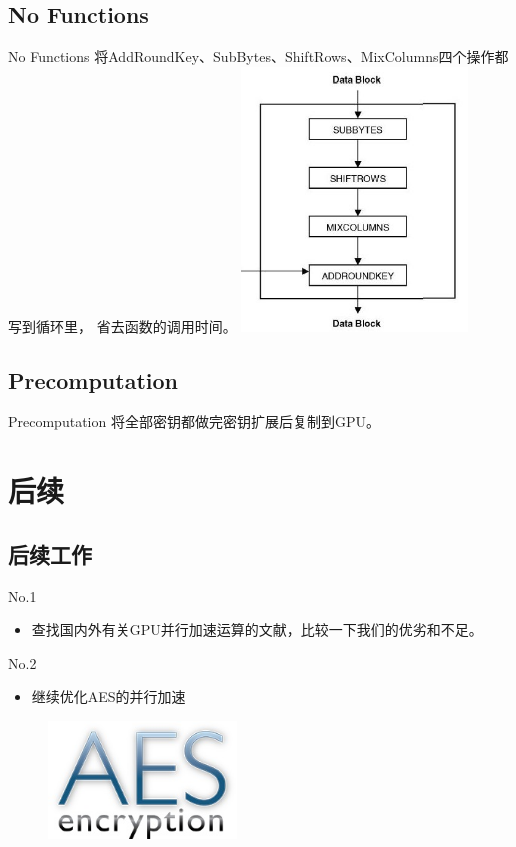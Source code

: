 \documentclass{beamer}
\begin{document}
\subsection{No Functions}

\begin{frame}{No Functions}
   将AddRoundKey、SubBytes、ShiftRows、MixColumns四个操作都写到循环里，
   省去函数的调用时间。
   \centering
   \includegraphics[width=6cm]{round.jpg}
\end{frame}

\subsection{Precomputation}

\begin{frame}{Precomputation}
   将全部密钥都做完密钥扩展后复制到GPU。
\end{frame}

\section{后续}

\subsection{后续工作}
\begin{frame}{No.1}
  \begin{itemize}
  \item 查找国内外有关GPU并行加速运算的文献，比较一下我们的优劣和不足。
  \end{itemize}
\end{frame}

\begin{frame}{No.2}
  \begin{itemize}
  \item 继续优化AES的并行加速
  \end{itemize}
  \begin{figure}
    \raggedright
    \includegraphics[width=5cm]{aes-logo.jpg}
  \end{figure}
\end{frame}
\end{document}
